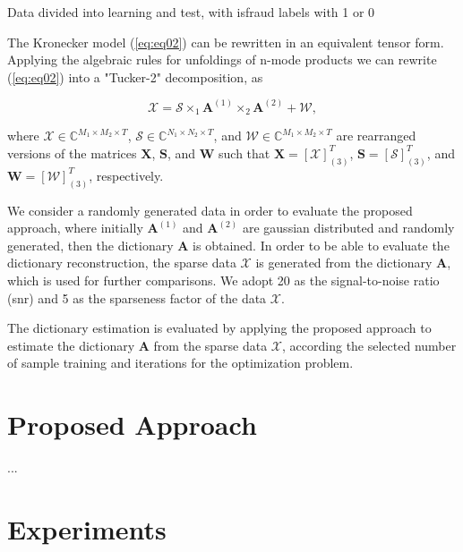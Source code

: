 Data divided into learning and test, with isfraud labels with 1 or 0


The Kronecker model (\ref{eq:eq02}) can be rewritten in an equivalent tensor form. Applying the algebraic rules for unfoldings of n-mode products \cite{roemer2014tensor} we can rewrite (\ref{eq:eq02}) into a "Tucker-2" decomposition, as

\begin{equation}\label{eq:eq03}
\boldsymbol{\mathcal{X}} = \boldsymbol{\mathcal{S}} \times_1 \boldsymbol{A}^{(1)} \times_2 \boldsymbol{A}^{(2)} +  \boldsymbol{\mathcal{W}},
\end{equation}

where $\boldsymbol{\mathcal{X}} \in \mathbb{C}^{M_1 \times M_2 \times T}$, $\boldsymbol{\mathcal{S}} \in \mathbb{C}^{N_1 \times N_2 \times T}$, and $\boldsymbol{\mathcal{W}} \in \mathbb{C}^{M_1 \times M_2 \times T}$ are rearranged versions of the matrices $\boldsymbol{X}$, $\boldsymbol{S}$, and $\boldsymbol{W}$ such that $\boldsymbol{X} = [\boldsymbol{\mathcal{X}}]_{(3)}^T$, $\boldsymbol{S} = [\boldsymbol{\mathcal{S}}]_{(3)}^T$, and $\boldsymbol{W} = [\boldsymbol{\mathcal{W}}]_{(3)}^T$, respectively.

We consider a randomly generated data in order to evaluate the proposed approach, where initially $\boldsymbol{A}^{(1)}$ and $\boldsymbol{A}^{(2)}$ are gaussian distributed and randomly generated, then the dictionary $\boldsymbol{A}$ is obtained. In order to be able to evaluate the dictionary reconstruction, the sparse data $\boldsymbol{\mathcal{X}}$ is generated from the dictionary $\boldsymbol{A}$, which is used for further comparisons. We adopt 20 as the signal-to-noise ratio (snr) and 5 as the sparseness factor of the data $\boldsymbol{\mathcal{X}}$. 

The dictionary estimation is evaluated by applying the proposed approach to estimate the dictionary $\boldsymbol{A}$ from the sparse data $\boldsymbol{\mathcal{X}}$, according the selected number of sample training and iterations for the optimization problem.


\section{Proposed Approach}
\label{sec:4_proposal}

...

\section{Experiments}
\label{sec:4_experiments}

